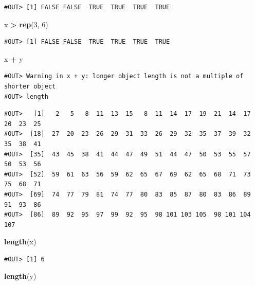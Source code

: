 \documentclass[]{book}
\newenvironment{Shaded}{\begin{snugshade}}{\end{snugshade}}
\newcommand{\KeywordTok}[1]{\textcolor[rgb]{0.13,0.29,0.53}{\textbf{#1}}}
\newcommand{\DecValTok}[1]{\textcolor[rgb]{0.00,0.00,0.81}{#1}}
\newcommand{\StringTok}[1]{\textcolor[rgb]{0.31,0.60,0.02}{#1}}
\newcommand{\OperatorTok}[1]{\textcolor[rgb]{0.81,0.36,0.00}{\textbf{#1}}}
\newcommand{\NormalTok}[1]{#1}
\theoremstyle{definition}
\theoremstyle{definition}
\theoremstyle{definition}
\theoremstyle{remark}
\begin{document}
\begin{verbatim}
#OUT> [1] FALSE FALSE  TRUE  TRUE  TRUE  TRUE
\end{verbatim}

\begin{Shaded}
\begin{Highlighting}[]
\NormalTok{x }\OperatorTok{>}\StringTok{ }\KeywordTok{rep}\NormalTok{(}\DecValTok{3}\NormalTok{, }\DecValTok{6}\NormalTok{)}
\end{Highlighting}
\end{Shaded}

\begin{verbatim}
#OUT> [1] FALSE FALSE  TRUE  TRUE  TRUE  TRUE
\end{verbatim}

\begin{Shaded}
\begin{Highlighting}[]
\NormalTok{x }\OperatorTok{+}\StringTok{ }\NormalTok{y}
\end{Highlighting}
\end{Shaded}

\begin{verbatim}
#OUT> Warning in x + y: longer object length is not a multiple of shorter object
#OUT> length
\end{verbatim}

\begin{verbatim}
#OUT>   [1]   2   5   8  11  13  15   8  11  14  17  19  21  14  17  20  23  25
#OUT>  [18]  27  20  23  26  29  31  33  26  29  32  35  37  39  32  35  38  41
#OUT>  [35]  43  45  38  41  44  47  49  51  44  47  50  53  55  57  50  53  56
#OUT>  [52]  59  61  63  56  59  62  65  67  69  62  65  68  71  73  75  68  71
#OUT>  [69]  74  77  79  81  74  77  80  83  85  87  80  83  86  89  91  93  86
#OUT>  [86]  89  92  95  97  99  92  95  98 101 103 105  98 101 104 107
\end{verbatim}

\begin{Shaded}
\begin{Highlighting}[]
\KeywordTok{length}\NormalTok{(x)}
\end{Highlighting}
\end{Shaded}

\begin{verbatim}
#OUT> [1] 6
\end{verbatim}

\begin{Shaded}
\begin{Highlighting}[]
\KeywordTok{length}\NormalTok{(y)}
\end{Highlighting}
\end{Shaded}
\end{document}
